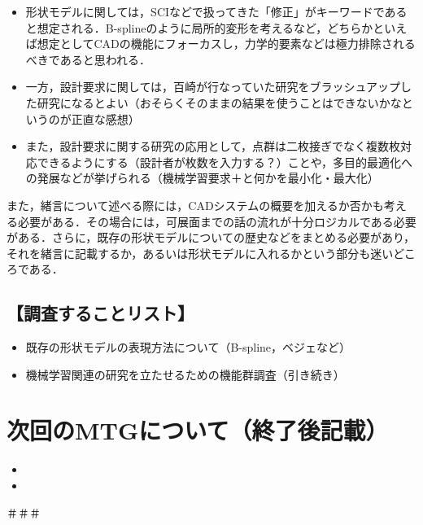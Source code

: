 \documentclass[16pt]{jsarticle}
\begin{document}
			\begin{itemize}
				\item 形状モデルに関しては，SCIなどで扱ってきた「修正」がキーワードであると想定される．B-splineのように局所的変形を考えるなど，どちらかといえば想定としてCADの機能にフォーカスし，力学的要素などは極力排除されるべきであると思われる．
				\item 一方，設計要求に関しては，百崎が行なっていた研究をブラッシュアップした研究になるとよい（おそらくそのままの結果を使うことはできないかなというのが正直な感想）
				\item また，設計要求に関する研究の応用として，点群は二枚接ぎでなく複数枚対応できるようにする（設計者が枚数を入力する？）ことや，多目的最適化への発展などが挙げられる（機械学習要求＋と何かを最小化・最大化）
			\end{itemize}
			また，緒言について述べる際には，CADシステムの概要を加えるか否かも考える必要がある．その場合には，可展面までの話の流れが十分ロジカルである必要がある．さらに，既存の形状モデルについての歴史などをまとめる必要があり，それを緒言に記載するか，あるいは形状モデルに入れるかという部分も迷いどころである．
		\subsection*{【調査することリスト】}
			\begin{itemize}
				\item 既存の形状モデルの表現方法について（B-spline，ベジェなど）
				\item 機械学習関連の研究を立たせるための機能群調査（引き続き）
			\end{itemize}
	\section{次回のMTGについて（終了後記載）}
	\begin{itemize}
		\item  
		\item 
	\end{itemize}
	＃＃＃
	\newpage
	

\end{document}
